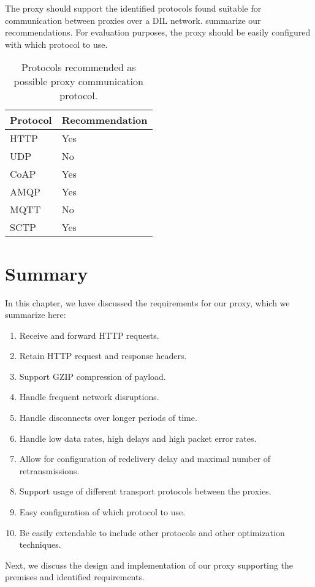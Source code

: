 The proxy should support the identified protocols found suitable for
communication between proxies over a DIL network.
 summarize our recommendations. For
evaluation purposes, the proxy should be easily configured with which protocol
to use.

\begin{table}[h]
\begin{tabularx}{\textwidth}{| X | X |}
\hline
  \textbf{Protocol} & \textbf{Recommendation} \\ \hline
  HTTP & Yes \\ \hline
  UDP & No \\ \hline
  CoAP & Yes \\ \hline
  AMQP & Yes \\ \hline
  MQTT & No \\ \hline
  SCTP & Yes \\ \hline
\end{tabularx}
\caption{Protocols recommended as possible proxy communication protocol.}
\label{table:possible-proxy-protocols}
\end{table}



\section{Summary}
\label{section:requirements-summary}

In this chapter, we have discussed the requirements for our proxy, which we
summarize here:

\begin{enumerate}
    \item Receive and forward HTTP requests.
    \item Retain HTTP request and response headers.
    \item Support GZIP compression of payload.
    \item Handle frequent network disruptions.
    \item Handle disconnects over longer periods of time.
    \item Handle low data rates, high delays and high packet error rates.
    \item Allow for configuration of redelivery delay and maximal number of retransmissions.
    \item Support usage of different transport protocols between the proxies.
    \item Easy configuration of which protocol to use.
    \item Be easily extendable to include other protocols and other optimization techniques.
\end{enumerate}

Next, we discuss the design and implementation of our proxy supporting the
premises and identified requirements.
